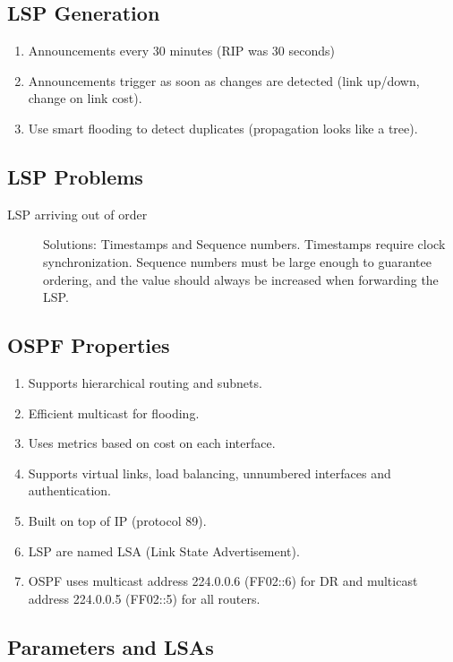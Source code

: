 \documentclass{article}
\begin{document}
\subsection{LSP Generation}

\begin{enumerate}
	\item Announcements every 30 minutes (RIP was 30 seconds)
	\item Announcements trigger as soon as changes are detected (link up/down, change on link cost).
	\item Use smart flooding to detect duplicates (propagation looks like a tree).
\end{enumerate}


\subsection{LSP Problems}

\begin{description}
	\item[LSP arriving out of order] Solutions: Timestamps and Sequence numbers. Timestamps require clock synchronization. Sequence numbers must be large enough to guarantee ordering, and the value should always be increased when forwarding the LSP. 
\end{description}
	
	
\subsection{OSPF Properties}
	
\begin{enumerate}
	\item Supports hierarchical routing and subnets.
	\item Efficient multicast for flooding.
	\item Uses metrics based on cost on each interface.
	\item Supports virtual links, load balancing, unnumbered interfaces and authentication.
	\item Built on top of IP (protocol 89).
	\item LSP are named LSA (Link State Advertisement).
	\item OSPF uses multicast address 224.0.0.6 (FF02::6) for DR and multicast address 224.0.0.5 (FF02::5) for all routers.
\end{enumerate}


\subsection{Parameters and LSAs}
	
\end{document}

